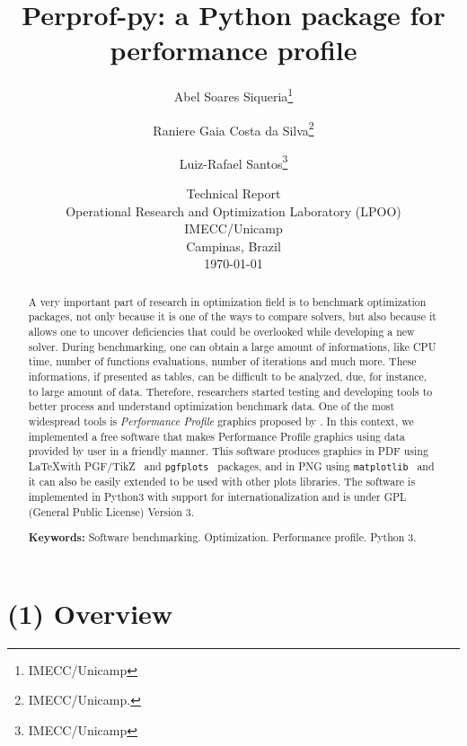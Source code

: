 \documentclass[10pt,a4paper]{article}
\begin{document}
\title{Perprof-py: a {P}ython package for performance profile}
\author{ Abel Soares Siqueria\thanks{IMECC/Unicamp}  \and Raniere Gaia Costa da
  Silva\thanks{IMECC/Unicamp.} \and Luiz-Rafael Santos\thanks{IMECC/Unicamp}}
\date{Technical Report \\ Operational Research and Optimization Laboratory
  (LPOO) \\ IMECC/Unicamp \\ Campinas, Brazil \\ \today}
\maketitle

\begin{abstract}
    A very important part of research in optimization field is to benchmark
    optimization packages, not only because it is one of the ways to compare
    solvers, but also because it allows one to uncover deficiencies that could
    be overlooked while developing a new solver. During benchmarking, one can
    obtain a large amount of  informations, like CPU time, number of functions
    evaluations, number of iterations and much more. These informations, if
    presented as tables, can be difficult to be analyzed, due, for instance, to
    large amount of data.  Therefore, researchers started testing and developing
    tools to better process and understand optimization benchmark data. One of
    the most widespread tools is \emph{Performance Profile} graphics proposed by
    \textcite{Dolan:2002du}. In this context, we implemented a free software
    that makes Performance Profile graphics using data provided by user in a
    friendly manner. This software produces graphics in PDF using \LaTeX with
    PGF/TikZ~\cite{TikZ} and \texttt{pgfplots}~\cite{pgfplots} packages, and in
    PNG using \texttt{matplotlib}~\cite{Hunter:2007} and it can also be easily
    extended to be used with other plots libraries. The software is implemented
    in Python3 with support for internationalization and is under GPL (General
    Public License) Version 3.

    \textbf{Keywords:} Software benchmarking.  Optimization. Performance profile. Python 3.
\end{abstract}

\section*{(1) Overview}
\end{document}
